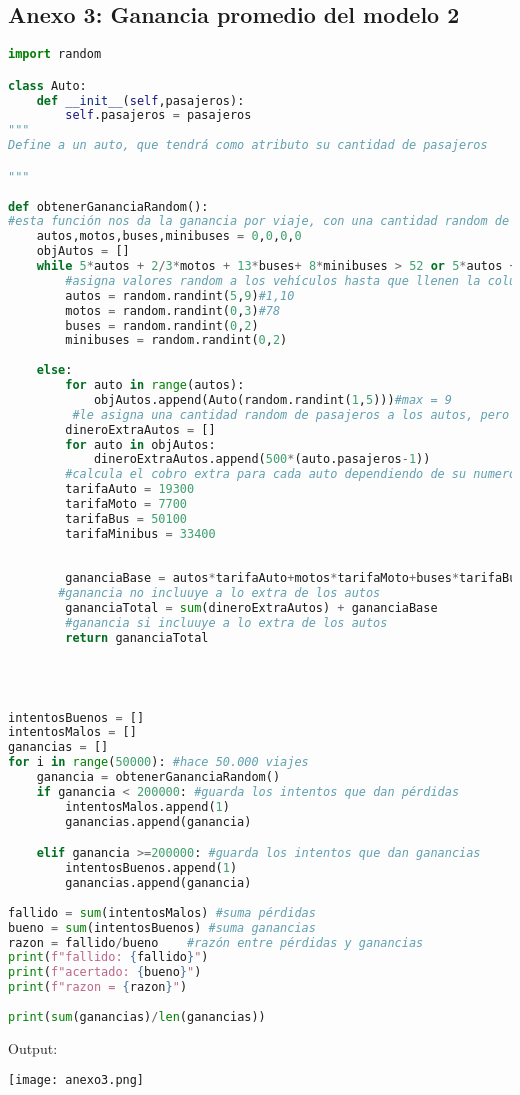 \documentclass[a4paper]{article}
\begin{document}
\subsection{Anexo 3: Ganancia promedio del modelo 2}
\begin{lstlisting}[language = Python]
import random 

class Auto:
    def __init__(self,pasajeros):
        self.pasajeros = pasajeros
"""
Define a un auto, que tendrá como atributo su cantidad de pasajeros

"""
    
def obtenerGananciaRandom(): 
#esta función nos da la ganancia por viaje, con una cantidad random de vehículos, pero que llenen la columna
    autos,motos,buses,minibuses = 0,0,0,0 
    objAutos = []
    while 5*autos + 2/3*motos + 13*buses+ 8*minibuses > 52 or 5*autos + 2/3*motos + 13*buses+ 8*minibuses < 48:
        #asigna valores random a los vehículos hasta que llenen la columna
        autos = random.randint(5,9)#1,10
        motos = random.randint(0,3)#78
        buses = random.randint(0,2)
        minibuses = random.randint(0,2)
        
    else:
        for auto in range(autos):
            objAutos.append(Auto(random.randint(1,5)))#max = 9
         #le asigna una cantidad random de pasajeros a los autos, pero acotada de 1 a 5
        dineroExtraAutos = []
        for auto in objAutos:
            dineroExtraAutos.append(500*(auto.pasajeros-1))
        #calcula el cobro extra para cada auto dependiendo de su numero de pasajeros
        tarifaAuto = 19300
        tarifaMoto = 7700
        tarifaBus = 50100 
        tarifaMinibus = 33400
       
        
        gananciaBase = autos*tarifaAuto+motos*tarifaMoto+buses*tarifaBus+minibuses*tarifaMinibus
       #ganancia no incluuye a lo extra de los autos
        gananciaTotal = sum(dineroExtraAutos) + gananciaBase
        #ganancia si incluuye a lo extra de los autos
        return gananciaTotal  


    

intentosBuenos = []
intentosMalos = []
ganancias = []
for i in range(50000): #hace 50.000 viajes
    ganancia = obtenerGananciaRandom()
    if ganancia < 200000: #guarda los intentos que dan pérdidas
        intentosMalos.append(1)
        ganancias.append(ganancia)

    elif ganancia >=200000: #guarda los intentos que dan ganancias
        intentosBuenos.append(1)
        ganancias.append(ganancia)
        
fallido = sum(intentosMalos) #suma pérdidas
bueno = sum(intentosBuenos) #suma ganancias
razon = fallido/bueno    #razón entre pérdidas y ganancias
print(f"fallido: {fallido}") 
print(f"acertado: {bueno}")
print(f"razon = {razon}")
    
print(sum(ganancias)/len(ganancias))
\end{lstlisting}
Output:
\begin{center}
    \texttt{[image: anexo3.png]}
\end{center}
\end{document}
